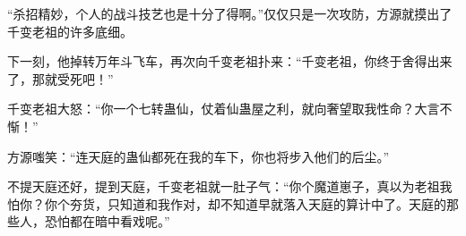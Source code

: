 \begin{this_body}
“杀招精妙，个人的战斗技艺也是十分了得啊。”仅仅只是一次攻防，方源就摸出了千变老祖的许多底细。

下一刻，他掉转万年斗飞车，再次向千变老祖扑来：“千变老祖，你终于舍得出来了，那就受死吧！”

千变老祖大怒：“你一个七转蛊仙，仗着仙蛊屋之利，就向奢望取我性命？大言不惭！”

方源嗤笑：“连天庭的蛊仙都死在我的车下，你也将步入他们的后尘。”

不提天庭还好，提到天庭，千变老祖就一肚子气：“你个魔道崽子，真以为老祖我怕你？你个夯货，只知道和我作对，却不知道早就落入天庭的算计中了。天庭的那些人，恐怕都在暗中看戏呢。”

\end{this_body}

